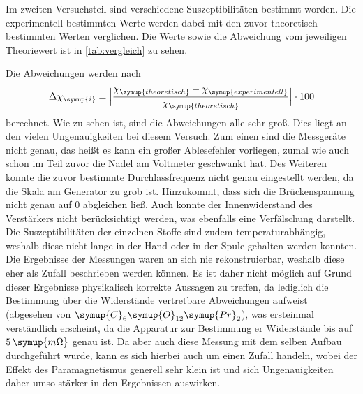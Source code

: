 Im zweiten Versuchsteil sind verschiedene Suszeptibilitäten bestimmt worden. Die experimentell bestimmten Werte werden dabei mit den zuvor
theoretisch bestimmten Werten verglichen. Die Werte sowie die Abweichung vom jeweiligen Theoriewert ist in \autoref{tab:vergleich} zu sehen.

Die Abweichungen werden nach 
\begin{equation}
\label{eqn:abweich}
\Delta \chi_{\symup{i}}= \Bigl| \frac{\chi_{\symup{theoretisch}} - \chi_{\symup{experimentell}}}{\chi_{\symup{theoretisch}}} \Bigr| \cdot 100
\end{equation}
berechnet. Wie zu sehen ist, sind die Abweichungen alle sehr groß. Dies liegt an den vielen Ungenauigkeiten bei diesem Versuch.
Zum einen sind die Messgeräte nicht genau, das heißt es kann ein großer Ablesefehler vorliegen, zumal wie auch schon im Teil zuvor
die Nadel am Voltmeter geschwankt hat. Des Weiteren konnte die zuvor bestimmte Durchlassfrequenz nicht genau eingestellt werden, da die 
Skala am Generator zu grob ist. Hinzukommt, dass sich die Brückenspannung nicht genau auf 0 abgleichen ließ. Auch konnte der 
Innenwiderstand des Verstärkers nicht berücksichtigt werden, was ebenfalls eine Verfälschung darstellt. Die Suszeptibilitäten der einzelnen 
Stoffe sind zudem temperaturabhängig, weshalb diese nicht lange in der Hand oder in der Spule gehalten werden konnten. Die Ergebnisse 
der Messungen waren an sich nie rekonstruierbar, weshalb diese eher als Zufall beschrieben werden können. Es ist daher nicht möglich
auf Grund dieser Ergebnisse physikalisch korrekte Aussagen zu treffen, da lediglich die Bestimmung über die Widerstände vertretbare 
Abweichungen aufweist (abgesehen von $\symup{C}_6\symup{O}_{12}\symup{Pr}_2$), was ersteinmal verständlich erscheint, da die Apparatur
zur Bestimmung er Widerstände bis auf $5 \, \symup{m\Omega}$ genau ist. Da aber auch diese Messung mit dem selben Aufbau durchgeführt wurde,
kann es sich hierbei auch um einen Zufall handeln, wobei der Effekt des Paramagnetismus generell sehr klein ist und sich Ungenauigkeiten daher
umso stärker in den Ergebnissen auswirken.